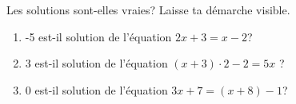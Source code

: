 %
%
    Les solutions sont-elles vraies? Laisse ta démarche visible.
    \begin{enumerate}[itemsep=1em]
        \item -5 est-il solution de l'équation \(2x +3 = x -2\)?
        \item 3 est-il solution de l'équation \((x+3)\cdot 2- 2 = 5x \) ?
        \item 0 est-il solution de l'équation \(3x + 7 = (x + 8) - 1\)?
    \end{enumerate}
    \vspace{2em}
